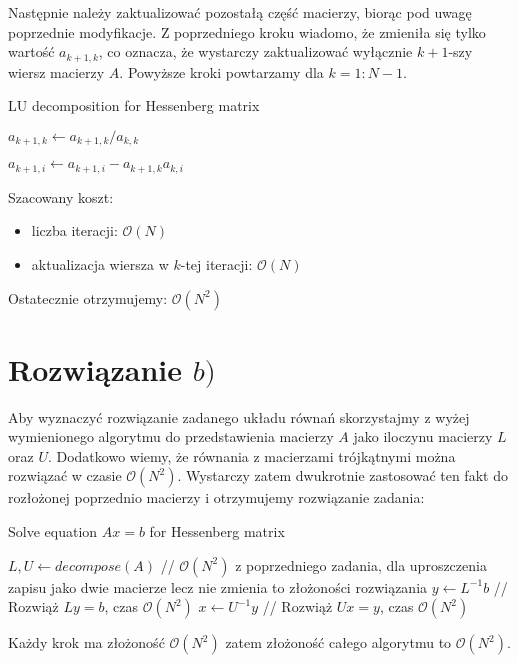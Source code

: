 \documentclass[a4paper]{article}
\begin{document}
Następnie należy zaktualizować pozostałą część macierzy, biorąc pod uwagę poprzednie modyfikacje. Z poprzedniego kroku wiadomo, że zmieniła się tylko wartość $a_{k+1,k}$, co oznacza, że wystarczy zaktualizować wyłącznie $k+1$-szy wiersz macierzy $A$. Powyższe kroki powtarzamy dla $k = 1 : N - 1$.

\begin{algorithm}
	\begin{algorithmic}[1]
		\caption{LU decomposition for Hessenberg matrix}\label{alg:cap1}
		\State $a_{k+1,k} \gets a_{k+1,k} / a_{k,k}$

		\State $a_{k+1,i} \gets a_{k+1,i} - a_{k+1,k}a_{k,i}$
		\EndFor
		\EndFor
	\end{algorithmic}\label{alg:algorithm1}
\end{algorithm}

\newpage
Szacowany koszt:
\begin{itemize}
	\item
	      liczba iteracji: $\mathcal{O}(N)$

	\item
	      aktualizacja wiersza w $k$-tej iteracji: $\mathcal{O}(N)$

\end{itemize}

Ostatecznie otrzymujemy: $\mathcal{O}(N^2)$

\section*{\large Rozwiązanie $b)$}

Aby wyznaczyć rozwiązanie zadanego układu równań skorzystajmy z wyżej wymienionego algorytmu do przedstawienia macierzy $A$ jako iloczynu macierzy $L$ oraz $U$. Dodatkowo wiemy, że równania z macierzami trójkątnymi można rozwiązać w czasie $\mathcal{O}(N^2)$. Wystarczy zatem dwukrotnie zastosować ten fakt do rozłożonej poprzednio macierzy i otrzymujemy rozwiązanie zadania:

\begin{algorithm}
	\begin{algorithmic}[1]
		\caption{Solve equation $Ax=b$ for Hessenberg matrix}\label{alg:cap2}
		\State $L,U \gets decompose(A)$ // $\mathcal{O}(N^2)$ z poprzedniego zadania, dla uproszczenia zapisu jako dwie macierze lecz nie zmienia to złożoności rozwiązania
		\State $y \gets L^{-1}b$ // Rozwiąż $Ly=b$, czas $\mathcal{O}(N^2)$
		\State $x \gets U^{-1}y$ // Rozwiąż $Ux=y$, czas $\mathcal{O}(N^2)$
	\end{algorithmic}\label{alg:algorithm2}
\end{algorithm}
Każdy krok ma złożoność $\mathcal{O}(N^2)$ zatem złożoność całego algorytmu to $\mathcal{O}(N^2)$.
\end{document}
